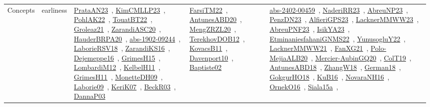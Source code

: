 {\begin{longtable}{lp{3cm}>{\raggedright\arraybackslash}p{6cm}>{\raggedright\arraybackslash}p{6cm}>{\raggedright\arraybackslash}p{8cm}}
Concepts & earliness & \href{../works/PrataAN23.pdf}{PrataAN23}~\cite{PrataAN23}, \href{../works/KimCMLLP23.pdf}{KimCMLLP23}~\cite{KimCMLLP23}, \href{../works/PohlAK22.pdf}{PohlAK22}~\cite{PohlAK22}, \href{../works/TouatBT22.pdf}{TouatBT22}~\cite{TouatBT22}, \href{../works/Groleaz21.pdf}{Groleaz21}~\cite{Groleaz21}, \href{../works/ZarandiASC20.pdf}{ZarandiASC20}~\cite{ZarandiASC20}, \href{../works/HauderBRPA20.pdf}{HauderBRPA20}~\cite{HauderBRPA20}, \href{../works/abs-1902-09244.pdf}{abs-1902-09244}~\cite{abs-1902-09244}, \href{../works/LaborieRSV18.pdf}{LaborieRSV18}~\cite{LaborieRSV18}, \href{../works/ZarandiKS16.pdf}{ZarandiKS16}~\cite{ZarandiKS16}, \href{../works/Dejemeppe16.pdf}{Dejemeppe16}~\cite{Dejemeppe16}, \href{../works/GrimesH15.pdf}{GrimesH15}~\cite{GrimesH15}, \href{../works/LombardiM12.pdf}{LombardiM12}~\cite{LombardiM12}, \href{../works/KelbelH11.pdf}{KelbelH11}~\cite{KelbelH11}, \href{../works/GrimesH11.pdf}{GrimesH11}~\cite{GrimesH11}, \href{../works/MonetteDH09.pdf}{MonetteDH09}~\cite{MonetteDH09}, \href{../works/Laborie09.pdf}{Laborie09}~\cite{Laborie09}, \href{../works/KeriK07.pdf}{KeriK07}~\cite{KeriK07}, \href{../works/BeckR03.pdf}{BeckR03}~\cite{BeckR03}, \href{../works/DannaP03.pdf}{DannaP03}~\cite{DannaP03} & \href{../works/FarsiTM22.pdf}{FarsiTM22}~\cite{FarsiTM22}, \href{../works/AntunesABD20.pdf}{AntunesABD20}~\cite{AntunesABD20}, \href{../works/MengZRZL20.pdf}{MengZRZL20}~\cite{MengZRZL20}, \href{../works/TerekhovDOB12.pdf}{TerekhovDOB12}~\cite{TerekhovDOB12}, \href{../works/KovacsB11.pdf}{KovacsB11}~\cite{KovacsB11}, \href{../works/Davenport10.pdf}{Davenport10}~\cite{Davenport10}, \href{../works/Baptiste02.pdf}{Baptiste02}~\cite{Baptiste02} & \href{../works/abs-2402-00459.pdf}{abs-2402-00459}~\cite{abs-2402-00459}, \href{../works/NaderiRR23.pdf}{NaderiRR23}~\cite{NaderiRR23}, \href{../works/AbreuNP23.pdf}{AbreuNP23}~\cite{AbreuNP23}, \href{../works/PenzDN23.pdf}{PenzDN23}~\cite{PenzDN23}, \href{../works/AlfieriGPS23.pdf}{AlfieriGPS23}~\cite{AlfieriGPS23}, \href{../works/LacknerMMWW23.pdf}{LacknerMMWW23}~\cite{LacknerMMWW23}, \href{../works/AbreuPNF23.pdf}{AbreuPNF23}~\cite{AbreuPNF23}, \href{../works/IsikYA23.pdf}{IsikYA23}~\cite{IsikYA23}, \href{../works/EtminaniesfahaniGNMS22.pdf}{EtminaniesfahaniGNMS22}~\cite{EtminaniesfahaniGNMS22}, \href{../works/YunusogluY22.pdf}{YunusogluY22}~\cite{YunusogluY22}, \href{../works/LacknerMMWW21.pdf}{LacknerMMWW21}~\cite{LacknerMMWW21}, \href{../works/FanXG21.pdf}{FanXG21}~\cite{FanXG21}, \href{../works/Polo-MejiaALB20.pdf}{Polo-MejiaALB20}~\cite{Polo-MejiaALB20}, \href{../works/Mercier-AubinGQ20.pdf}{Mercier-AubinGQ20}~\cite{Mercier-AubinGQ20}, \href{../works/ColT19.pdf}{ColT19}~\cite{ColT19}, \href{../works/AntunesABD18.pdf}{AntunesABD18}~\cite{AntunesABD18}, \href{../works/ZhangW18.pdf}{ZhangW18}~\cite{ZhangW18}, \href{../works/German18.pdf}{German18}~\cite{German18}, \href{../works/GokgurHO18.pdf}{GokgurHO18}~\cite{GokgurHO18}, \href{../works/KuB16.pdf}{KuB16}~\cite{KuB16}, \href{../works/NovaraNH16.pdf}{NovaraNH16}~\cite{NovaraNH16}, \href{../works/OrnekO16.pdf}{OrnekO16}~\cite{OrnekO16}, \href{../works/Siala15a.pdf}{Siala15a}~\cite{Siala15a}, 
\end{longtable}}
